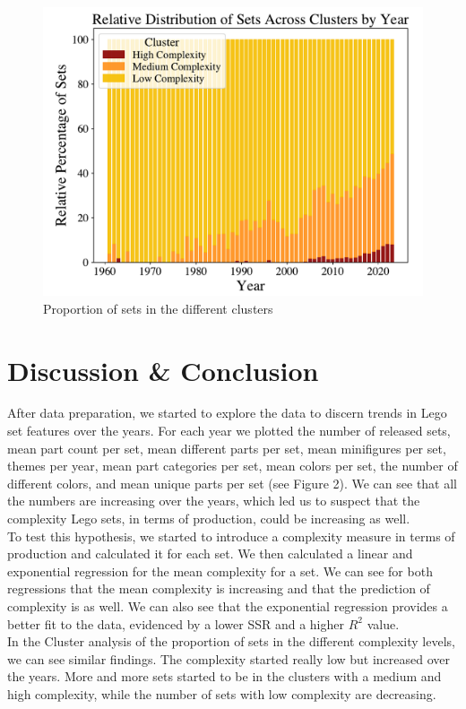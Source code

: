 \documentclass{article}
\theoremstyle{plain}
\theoremstyle{definition}
\theoremstyle{remark}
\begin{document}
\begin{figure}[ht]
 \vskip 0.2in
 \begin{center}
 \centerline{\includegraphics[width=\columnwidth]{Images/Clusters.pdf}}
\caption{Proportion of sets in the different clusters}
\label{icml-historical}
 \end{center}
 \vskip -0.2in
\end{figure}

\section{Discussion \& Conclusion}\label{sec:conclusion}

After data preparation, we started to explore the data to discern trends in Lego set features over the years. For each year we plotted the number of released sets, mean part count per set, mean different parts per set, mean minifigures per set, themes per year, mean part categories per set, mean colors per set, the number of different colors, and mean unique parts per set (see Figure 2). We can see that all the numbers are increasing over the years, which led us to suspect that the complexity Lego sets, in terms of production, could be increasing as well. \\
To test this hypothesis, we started to introduce a complexity measure in terms of production and calculated it for each set. We then calculated a linear and exponential regression for the mean complexity for a set. We can see for both regressions that the mean complexity is increasing and that the prediction of complexity is as well. We can also see that the exponential regression provides a better fit to the data, evidenced by a lower SSR and a higher $R^2$ value. \\
In the Cluster analysis of the proportion of sets in the different complexity levels, we can see similar findings. The complexity started really low but increased over the years. More and more sets started to be in the clusters with a medium and high complexity, while the number of sets with low complexity are decreasing. \\
\end{document}
